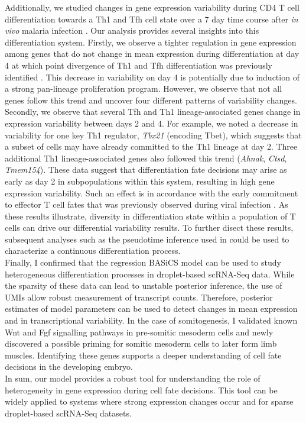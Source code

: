 \newpage

Additionally, we studied changes in gene expression variability during CD4\plus{} T cell differentiation towards a Th1 and Tfh cell state over a 7 day time course after \textit{in vivo} malaria infection \citep{Lonnberg2017}. Our analysis provides several insights into this differentiation system. Firstly, we observe a tighter regulation in gene expression among genes that do not change in mean expression during differentiation at day 4 at which point divergence of Th1 and Tfh differentiation was previously identified \citep{Lonnberg2017}. This decrease in variability on day 4 is potentially due to induction of a strong pan-lineage proliferation program. However, we observe that not all genes follow this trend and uncover four different patterns of variability changes. Secondly, we observe that several Tfh and Th1 lineage-associated genes change in expression variability between days 2 and 4. For example, we noted a decrease in variability for one key Th1 regulator, \textit{Tbx21} (encoding Tbet), which suggests that a subset of cells may have already committed to the Th1 lineage at day 2. Three additional Th1 lineage-associated genes also followed this trend (\textit{Ahnak}, \textit{Ctsd}, \textit{Tmem154}). These data suggest that differentiation fate decisions may arise as early as day 2 in subpopulations within this system, resulting in high gene expression variability. Such an effect is in accordance with the early commitment to effector T cell fates that was previously observed during viral infection \citep{Choi2011}. As these results illustrate, diversity in differentiation state within a population of T cells can drive our differential variability results. To further disect these results, subsequent analyses such as the pseudotime inference used in \cite{Lonnberg2017} could be used to characterize a continuous differentiation process.\\

Finally, I confirmed that the regression BASiCS model can be used to study heterogeneous differentiation processes in droplet-based scRNA-Seq data. While the sparsity of these data can lead to unstable posterior inference, the use of UMIs allow robust measurement of transcript counts. Therefore, posterior estimates of model parameters can be used to detect changes in mean expression and in transcriptional variability. In the case of somitogenesis, I validated known Wnt and Fgf signalling pathways in pre-somitic mesoderm cells and newly discovered a possible priming for somitic mesoderm cells to later form limb muscles. Identifying these genes supports a deeper understanding of cell fate decisions in the developing embryo.\\

In sum, our model provides a robust tool for understanding the role of heterogeneity in gene expression during cell fate decisions. This tool can be widely applied to systems where strong expression changes occur and for sparse droplet-based scRNA-Seq datasets.


